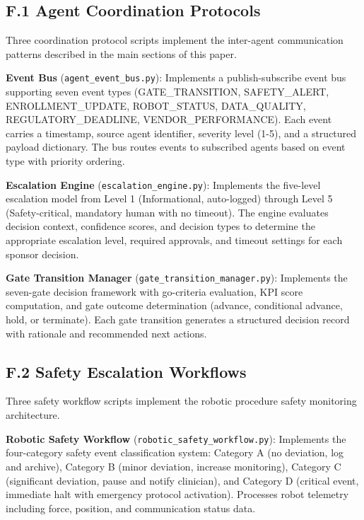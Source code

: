 \subsection*{F.1 Agent Coordination Protocols}

Three coordination protocol scripts implement the inter-agent communication
patterns described in the main sections of this paper.

\textbf{Event Bus} (\texttt{agent\_event\_bus.py}): Implements a
publish-subscribe event bus supporting seven event types
(GATE\_TRANSITION, SAFETY\_ALERT, ENROLLMENT\_UPDATE, ROBOT\_STATUS,
DATA\_QUALITY, REGULATORY\_DEADLINE, VENDOR\_PERFORMANCE). Each event
carries a timestamp, source agent identifier, severity level (1-5), and
a structured payload dictionary. The bus routes events to subscribed
agents based on event type with priority ordering.

\textbf{Escalation Engine} (\texttt{escalation\_engine.py}): Implements
the five-level escalation model from Level 1 (Informational, auto-logged)
through Level 5 (Safety-critical, mandatory human with no timeout). The
engine evaluates decision context, confidence scores, and decision types to
determine the appropriate escalation level, required approvals, and timeout
settings for each sponsor decision.

\textbf{Gate Transition Manager} (\texttt{gate\_transition\_manager.py}):
Implements the seven-gate decision framework with go-criteria evaluation,
KPI score computation, and gate outcome determination (advance, conditional
advance, hold, or terminate). Each gate transition generates a structured
decision record with rationale and recommended next actions.

\subsection*{F.2 Safety Escalation Workflows}

Three safety workflow scripts implement the robotic procedure safety
monitoring architecture.

\textbf{Robotic Safety Workflow} (\texttt{robotic\_safety\_workflow.py}):
Implements the four-category safety event classification system:
Category A (no deviation, log and archive), Category B (minor deviation,
increase monitoring), Category C (significant deviation, pause and notify
clinician), and Category D (critical event, immediate halt with emergency
protocol activation). Processes robot telemetry including force, position,
and communication status data.

